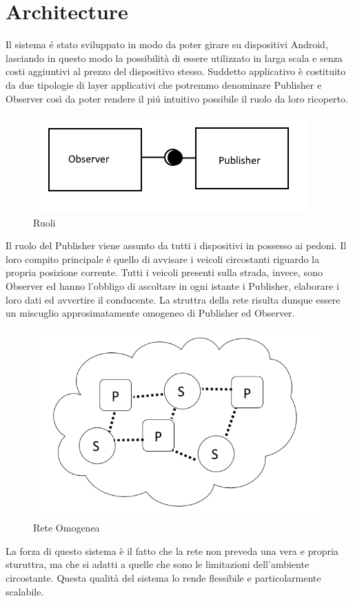 \documentclass[conference]{IEEEtran}
\begin{document}
\section{Architecture}
Il sistema \'e stato sviluppato in modo da poter girare su dispositivi Android, lasciando in questo modo la possibilità di essere utilizzato in larga scala e senza costi aggiuntivi al prezzo del dispositivo stesso.
Suddetto applicativo è costituito da due tipologie di layer applicativi che potremmo denominare Publisher e Observer così da poter rendere il pi\'u intuitivo possibile il ruolo da loro ricoperto.
\begin{figure}[h!]
	\centering
	\includegraphics[width=0.7\linewidth]{ps}
	\caption{Ruoli}
	\label{fig:ps}
\end{figure}
Il ruolo del Publisher viene assunto da tutti i dispositivi in possesso ai pedoni. Il loro compito principale \'e quello di avvisare i veicoli circostanti riguardo la propria posizione corrente.
Tutti i veicoli presenti sulla strada, invece, sono Observer ed hanno l'obbligo di ascoltare in ogni istante i Publisher, elaborare i loro dati ed avvertire il conducente.
La struttra della rete risulta dunque essere un miscuglio approsimatamente omogeneo di Publisher ed Observer.
\begin{figure}[h!]
	\centering
	\includegraphics[width=0.7\linewidth]{net}
	\caption{Rete Omogenea}
	\label{fig:net}
\end{figure}
La forza di questo sistema è il fatto che la rete non preveda una vera e propria sturuttra, ma che si adatti a quelle che sono le limitazioni dell'ambiente circostante.
Questa qualità del sistema lo rende flessibile e particolarmente scalabile.
\end{document}
